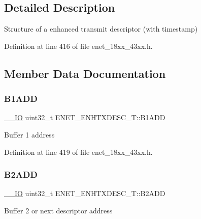 \subsection{Detailed Description}
Structure of a enhanced transmit descriptor (with timestamp) 

Definition at line 416 of file enet\+\_\+18xx\+\_\+43xx.\+h.



\subsection{Member Data Documentation}
\mbox{\label{struct_e_n_e_t___e_n_h_t_x_d_e_s_c___t_a1bdd8dec5a29c128809935c26f96c803}} 
\subsubsection{\texorpdfstring{B1\+A\+DD}{B1ADD}}
{\footnotesize\ttfamily \hyperlink{core__sc300_8h_aec43007d9998a0a0e01faede4133d6be}{\+\_\+\+\_\+\+IO} uint32\+\_\+t E\+N\+E\+T\+\_\+\+E\+N\+H\+T\+X\+D\+E\+S\+C\+\_\+\+T\+::\+B1\+A\+DD}

Buffer 1 address 

Definition at line 419 of file enet\+\_\+18xx\+\_\+43xx.\+h.

\mbox{\label{struct_e_n_e_t___e_n_h_t_x_d_e_s_c___t_a12208c6552e8a31b9e350d571212aafd}} 
\subsubsection{\texorpdfstring{B2\+A\+DD}{B2ADD}}
{\footnotesize\ttfamily \hyperlink{core__sc300_8h_aec43007d9998a0a0e01faede4133d6be}{\+\_\+\+\_\+\+IO} uint32\+\_\+t E\+N\+E\+T\+\_\+\+E\+N\+H\+T\+X\+D\+E\+S\+C\+\_\+\+T\+::\+B2\+A\+DD}

Buffer 2 or next descriptor address 

